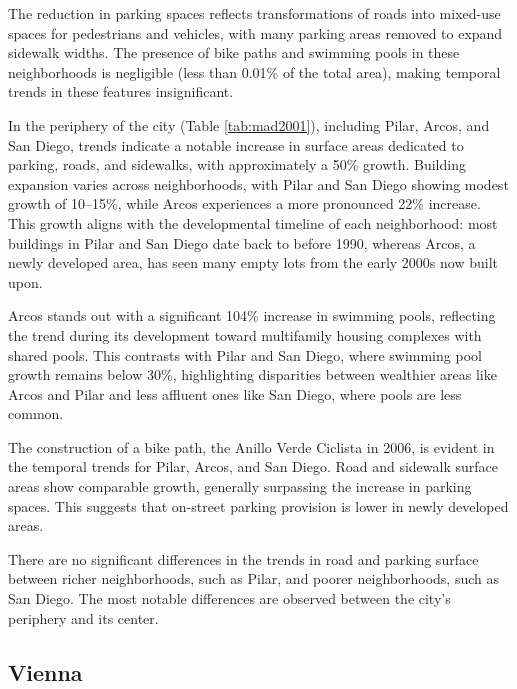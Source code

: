 \begin{refsection}
The reduction in parking spaces reflects transformations of roads into mixed-use spaces for pedestrians and vehicles, with many parking areas removed to expand sidewalk widths. The presence of bike paths and swimming pools in these neighborhoods is negligible (less than 0.01\% of the total area), making temporal trends in these features insignificant.

In the periphery of the city (Table \ref{tab:mad2001}), including Pilar, Arcos, and San Diego, trends indicate a notable increase in surface areas dedicated to parking, roads, and sidewalks, with approximately a 50\% growth. Building expansion varies across neighborhoods, with Pilar and San Diego showing modest growth of 10–15\%, while Arcos experiences a more pronounced 22\% increase. This growth aligns with the developmental timeline of each neighborhood: most buildings in Pilar and San Diego date back to before 1990, whereas Arcos, a newly developed area, has seen many empty lots from the early 2000s now built upon.

Arcos stands out with a significant 104\% increase in swimming pools, reflecting the trend during its development toward multifamily housing complexes with shared pools. This contrasts with Pilar and San Diego, where swimming pool growth remains below 30\%, highlighting disparities between wealthier areas like Arcos and Pilar and less affluent ones like San Diego, where pools are less common.

The construction of a bike path, the Anillo Verde Ciclista in 2006, is evident in the temporal trends for Pilar, Arcos, and San Diego. Road and sidewalk surface areas show comparable growth, generally surpassing the increase in parking spaces. This suggests that on-street parking provision is lower in newly developed areas.


There are no significant differences in the trends in road and parking surface between richer neighborhoods, such as Pilar, and poorer neighborhoods, such as San Diego. The most notable differences are observed between the city's periphery and its center. 

 


\subsection{Vienna}


\end{refsection}
